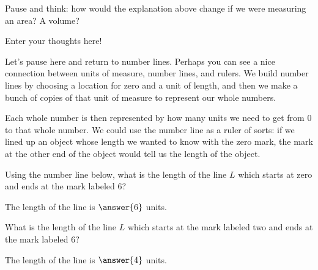 \documentclass{ximera}
\begin{document}
\begin{question}
Pause and think: how would the explanation above change if we were measuring an area? A volume?
\begin{freeResponse} Enter your thoughts here! \end{freeResponse}
\end{question}

Let's pause here and return to number lines. Perhaps you can see a nice connection between units of measure, number lines, and rulers. We build number lines by choosing a location for zero and a unit of length, and then we make a bunch of copies of that unit of measure to represent our whole numbers.
\begin{image}
\end{image}
Each whole number is then represented by how many units we need to get from $0$ to that whole number. We could use the number line as a ruler of sorts: if we lined up an object whose length we wanted to know with the zero mark, the mark at the other end of the object would tell us the length of the object. 
\begin{question}
Using the number line below, what is the length of the line $L$ which starts at zero and ends at the mark labeled $6$?
\begin{image}
\end{image}
\begin{prompt}
The length of the line is $\answer{6}$ units.
\end{prompt}
\end{question}

\begin{question}
What is the length of the line $L$ which starts at the mark labeled two and ends at the mark labeled $6$?
\begin{image}
\end{image}
\begin{prompt}
The length of the line is $\answer{4}$ units.
\end{prompt}
\end{question}
\end{document}
